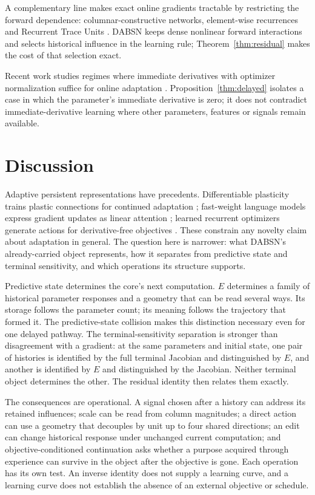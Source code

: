 \documentclass[11pt]{article}
\theoremstyle{definition}
\begin{document}
A complementary line makes exact online gradients tractable by restricting the
forward dependence: columnar-constructive networks, element-wise recurrences and
Recurrent Trace Units \citep{javed2023columnar,irie2024rtrl,elelimy2024rtu}. DABSN
keeps dense nonlinear forward interactions and selects historical influence in the
learning rule; Theorem~\ref{thm:residual} makes the cost of that selection exact.

Recent work studies regimes where immediate derivatives with optimizer
normalization suffice for online adaptation \citep{merin2026immediate}.
Proposition~\ref{thm:delayed} isolates a case in which the parameter's immediate
derivative is zero; it does not contradict immediate-derivative learning where
other parameters, features or signals remain available.

\section{Discussion}

Adaptive persistent representations have precedents. Differentiable plasticity
trains plastic connections for continued adaptation \citep{miconi2018plasticity};
fast-weight language models express gradient updates as linear attention
\citep{clark2022fastweights}; learned recurrent optimizers generate actions for
derivative-free objectives \citep{chen2017learn}. These constrain any novelty claim
about adaptation in general. The question here is narrower: what DABSN's
already-carried object represents, how it separates from predictive state and
terminal sensitivity, and which operations its structure supports.

Predictive state determines the core's next computation. $E$ determines a family of
historical parameter responses and a geometry that can be read several ways. Its
storage follows the parameter count; its meaning follows the trajectory that
formed it. The predictive-state collision makes this distinction necessary even for
one delayed pathway. The terminal-sensitivity separation is stronger than
disagreement with a gradient: at the same parameters and initial state, one pair of
histories is identified by the full terminal Jacobian and distinguished by $E$,
and another is identified by $E$ and distinguished by the Jacobian. Neither
terminal object determines the other. The residual identity then relates them
exactly.

The consequences are operational. A signal chosen after a history can address its
retained influences; scale can be read from column magnitudes; a direct action can
use a geometry that decouples by unit up to four shared directions; an edit can
change historical response under unchanged current computation; and
objective-conditioned continuation asks whether a purpose acquired through
experience can survive in the object after the objective is gone. Each operation
has its own test. An inverse identity does not supply a learning curve, and a
learning curve does not establish the absence of an external objective or
schedule.
\end{document}
